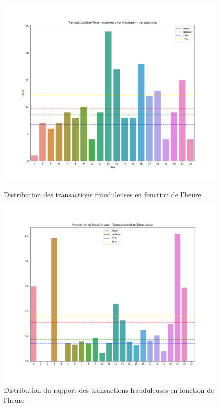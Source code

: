 \documentclass{article}
\begin{document}
\begin{figure}[h]
    \includegraphics[scale=0.2]{./images/TransactionStartTime_recurrence_fraud.png}
    \caption{Distribution des transactions frauduleuses en fonction de l'heure}
    \includegraphics[scale=0.2]{./images/TransactionStartTime_proportion_fraud.png}
    \caption{Distribution du rapport des transactions frauduleuses en fonction de l'heure}
\end{figure}
\end{document}
